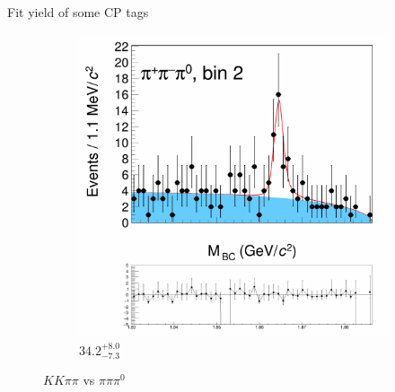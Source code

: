 \documentclass{beamer}
\begin{document}
\begin{frame}{Fit yield of some CP tags}
\begin{figure}
\begin{subfigure}{0.49\textwidth}
      \includegraphics[width = 1.0\textwidth, trim = {0 14cm 0 0}, clip = true]{Plots/DoubleTagYield_DoubleTag_CP_KKpipi_vs_pipipi0_SignalBin2.png}
      \caption{$34.2^{+8.0}_{-7.3}$}
    \end{subfigure}
    \caption{$KK\pi\pi$ vs $\pi\pi\pi^0$}
  \end{figure}
\end{frame}
\end{document}
